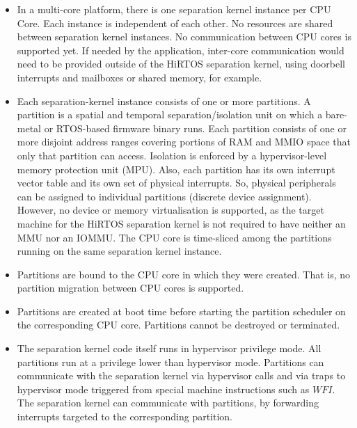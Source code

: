 \documentclass[11pt,letterpaper,twoside,openany]{book}
\begin{document}
\begin{itemize}

\item In a multi-core platform, there is one separation kernel instance per CPU Core. Each instance is
independent of each other. No resources are shared between separation kernel instances. No communication
between CPU cores is supported yet. If needed by the application, inter-core communication would need to
be provided outside of the HiRTOS separation kernel, using doorbell interrupts and mailboxes or shared
memory, for example.

\item Each separation-kernel instance consists of one or more partitions. A partition is a spatial and
temporal separation/isolation unit on which a bare-metal or RTOS-based firmware binary runs. Each partition
consists of one or more disjoint address ranges covering portions of RAM and MMIO space that only that
partition can access. Isolation is enforced by a hypervisor-level memory protection unit (MPU). Also,
each partition has its own interrupt vector table and its own set of physical interrupts. So, physical
peripherals can be assigned to individual partitions (discrete device assignment). However,
no device or memory virtualisation is supported, as the target machine for the HiRTOS separation kernel
is not required to have neither an MMU nor an IOMMU.
The CPU core is time-sliced among the partitions running on the same separation kernel instance.

\item
Partitions are bound to the CPU core in which they were created. That is, no partition migration between
CPU cores is supported.

\item
Partitions are created at boot time before starting the partition scheduler on the corresponding CPU core.
Partitions cannot be destroyed or terminated.

\item
The separation kernel code itself runs in hypervisor privilege mode. All partitions run at a privilege lower
than hypervisor mode. Partitions can communicate with the separation kernel via hypervisor calls and via
traps to hypervisor mode triggered from special machine instructions such as $WFI$. The separation kernel
can communicate with partitions, by forwarding interrupts targeted to the corresponding partition.

\end{itemize}
\end{document}
